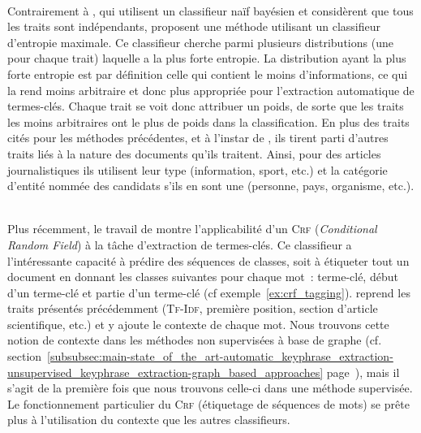         ~\\Contrairement à , qui utilisent un classifieur
        naïf bayésien et considèrent que tous les traits sont indépendants,
         proposent une méthode utilisant un
        classifieur d'entropie maximale. Ce classifieur cherche parmi plusieurs
        distributions (une pour chaque trait) laquelle a la plus forte entropie.
        La distribution ayant la plus forte entropie est par définition celle
        qui contient le moins d'informations, ce qui la rend moins arbitraire et
        donc plus appropriée pour l'extraction automatique de termes-clés.
        Chaque trait se voit donc attribuer un poids, de sorte que les traits
        les moins arbitraires ont le plus de poids dans la classification. En
        plus des traits cités pour les méthodes précédentes, et à l'instar de
        , ils tirent parti d'autres
        traits liés à la nature des documents qu'ils traitent. Ainsi, pour des
        articles journalistiques ils utilisent leur type (information, sport,
        etc.) et la catégorie d'entité nommée des candidats s'ils en sont une
        (personne, pays, organisme, etc.).

        ~\\Plus récemment, le travail de 
        montre l'applicabilité d'un \textsc{Crf} (\textit{Conditional Random
        Field}) à la tâche d'extraction de termes-clés. Ce classifieur a
        l'intéressante capacité à prédire des séquences de classes, soit à
        étiqueter tout un document en donnant les classes suivantes pour chaque
        mot~: \og{}terme-clé\fg{}, \og{}début d'un terme-clé\fg{} et \og{}partie
        d'un terme-clé\fg{} (cf
        exemple~\ref{ex:crf_tagging}). 
        reprend les traits présentés précédemment (\textsc{Tf-Idf}, première position,
        section d'article scientifique, etc.) et y ajoute le contexte de
        chaque mot. Nous trouvons cette notion de contexte dans les méthodes non
        supervisées à base de graphe (cf.
        section~\ref{subsubsec:main-state_of_the_art-automatic_keyphrase_extraction-unsupervised_keyphrase_extraction-graph_based_approaches}
        page~\pageref{subsubsec:main-state_of_the_art-automatic_keyphrase_extraction-unsupervised_keyphrase_extraction-graph_based_approaches}),
        mais il s'agit de la première fois que nous trouvons celle-ci dans une
        méthode supervisée. Le fonctionnement particulier du \textsc{Crf}
        (étiquetage de séquences de mots) se
        prête plus à l'utilisation du contexte que les autres classifieurs.


